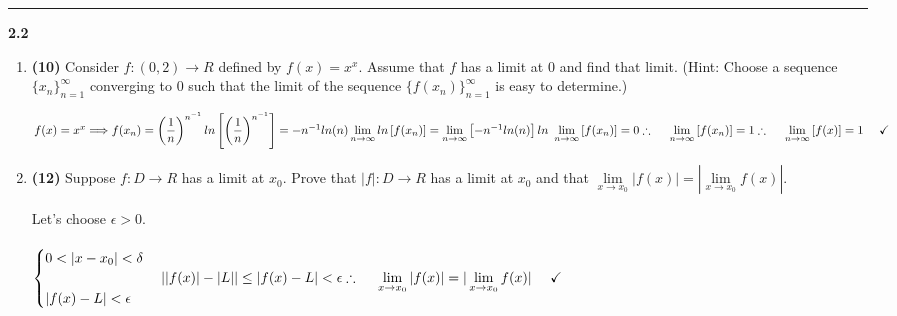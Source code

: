 \documentclass[fleqn]{article}
\begin{document}
  \rule{15cm}{2pt}

  \textbf{2.2}
  \begin{enumerate}
    \item \textbf{(10)} Consider $f: (0,2) \longrightarrow R$ defined by $f(x)=x^x$. Assume that $f$ has a limit at $0$ and find that limit.
    (Hint: Choose a sequence $\{x_n\}_{n=1}^{\infty}$ converging to $0$ such that the limit of the
    sequence $\{f(x_n)\}_{n=1}^{\infty}$ is easy to determine.)

      \textcolor{hwColor}{
        $
          f(x)=x^x \Longrightarrow f(x_n)=\left(\dfrac{1}{n}\right)^{n^{-1}}
          \\
          \\
          ln \left[\left(\dfrac{1}{n}\right)^{n^{-1}}\right]=-n^{-1} ln (n)
          \\
          \\
          \lim\limits_{n \to \infty} ln \left[f(x_n)\right]=\lim\limits_{n \to \infty} \left[-n^{-1} ln (n)\right]
          \\
          \\
          ln ~ \lim\limits_{n \to \infty}   \left[f(x_n)\right]=0
          \\
          \\
          \\
          \therefore ~~~~ \lim\limits_{n \to \infty} \left[f(x_n)\right]=1
          \\
          \\
          \\
          \therefore ~~~~  \lim\limits_{n \to \infty} \left[f(x)\right]=1 ~~~~ \checkmark
          \\
          \\
        $
      }


    \item \textbf{(12)} Suppose $f: D \longrightarrow R$ has a limit at $x_0$. Prove that $|f|: D \longrightarrow R$ has 
    a limit at $x_0$ and that $\lim\limits_{x \to x_0} |f(x)|=|\lim\limits_{x \to x_0} f(x)|$.

      \textcolor{hwColor}{
        Let's choose $\epsilon >0$. 
        \\
        \\
        $
          \begin{cases}
            0 < |x-x_0| < \delta 
            \\
            \\
            |f(x)-L| < \epsilon
          \end{cases}
          \\
          \\
          \\
          ||f(x)|-|L|| \leq |f(x)-L| < \epsilon
          \\
          \\
          \\
          \therefore ~~~~ \lim\limits_{x \to x_0} |f(x)|=|\lim\limits_{x \to x_0} f(x)| ~~~~ \checkmark
          \\
          \\
        $
      }



\end{enumerate}
\end{document}
